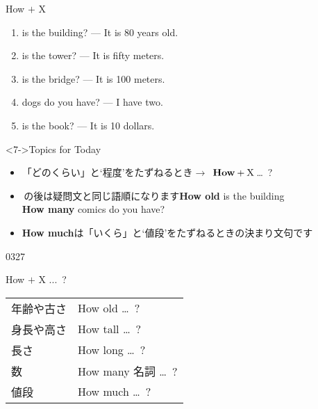 \documentclass[aspectratio=169,xcolor={dvipsnames,table}]{beamer}
\begin{document}
\begin{frame}[plain]{How $+$ X}
 \begin{enumerate}
  \item {} is the building? --- It is 80 years old.%
\hfill{}
  \item {} is the tower? --- It is fifty meters.%
\hfill{}
  \item {} is the bridge? --- It is 100 meters.
\hfill{}
  \item {} dogs do you have? --- I have two.
\hfill{}
  \item {} is the book? --- It is 10 dollars.
\hfill{}
 \end{enumerate}

\begin{block}<7->{Topics for Today}\small
\pause
\begin{itemize}[square]\small
 \item 「どのくらい」と`程度'をたずねるとき$\longrightarrow$\,\,\,$\text{\bfseries How} + \text{X}$\,\ldots{}\,\,\,?
 \item {}\,の後は疑問文と同じ語順になります\hfill{\bfseries How old} is the building\\
\hfill{}{\bfseries How many} comics do you have?
 \item   {\bfseries How much}は「いくら」と`値段'をたずねるときの決まり文句です
\end{itemize}
     \end{block}


\hfill{\tiny 0327}\,{\scriptsize{}}

\end{frame}
\begin{frame}[plain]{How $+$ X ...\,\,\,?}
 
 \begin{center}
\begin{tabular}{ll}\toprule
年齢や古さ& How old \ldots{}\, ?\\
身長や高さ& How tall \ldots{}\, ?\\
長さ&How long \ldots{}\, ?\\
数&How many 名詞 \ldots{}\, ?\\
値段&How much \ldots{}\, ?\\
\bottomrule
\end{tabular}
\end{center}
\end{frame}
\end{document}
